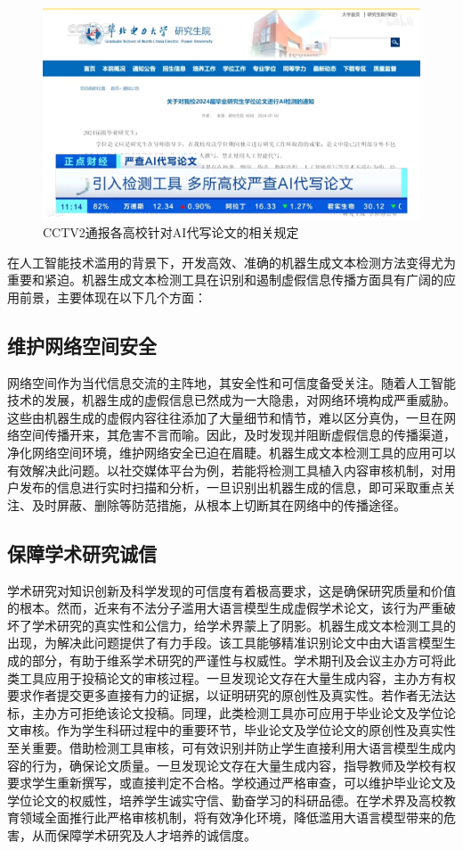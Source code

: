 \documentclass[a4paper]{report}
\begin{document}
\begin{figure}[H]
	\centering
	\includegraphics[width=1\textwidth]{高校针对AI代写论文的规定.png}
	\caption{CCTV2通报各高校针对AI代写论文的相关规定}
	\label{fig:高校针对AI代写论文的规定}
\end{figure}

在人工智能技术滥用的背景下，开发高效、准确的机器生成文本检测方法变得尤为重要和紧迫。机器生成文本检测工具在识别和遏制虚假信息传播方面具有广阔的应用前景，主要体现在以下几个方面：

\subsection{维护网络空间安全}
网络空间作为当代信息交流的主阵地，其安全性和可信度备受关注。随着人工智能技术的发展，机器生成的虚假信息已然成为一大隐患，对网络环境构成严重威胁。这些由机器生成的虚假内容往往添加了大量细节和情节，难以区分真伪，一旦在网络空间传播开来，其危害不言而喻。因此，及时发现并阻断虚假信息的传播渠道，净化网络空间环境，维护网络安全已迫在眉睫。机器生成文本检测工具的应用可以有效解决此问题。以社交媒体平台为例，若能将检测工具植入内容审核机制，对用户发布的信息进行实时扫描和分析，一旦识别出机器生成的信息，即可采取重点关注、及时屏蔽、删除等防范措施，从根本上切断其在网络中的传播途径。

\subsection{保障学术研究诚信}
学术研究对知识创新及科学发现的可信度有着极高要求，这是确保研究质量和价值的根本。然而，近来有不法分子滥用大语言模型生成虚假学术论文，该行为严重破坏了学术研究的真实性和公信力，给学术界蒙上了阴影。机器生成文本检测工具的出现，为解决此问题提供了有力手段。该工具能够精准识别论文中由大语言模型生成的部分，有助于维系学术研究的严谨性与权威性。学术期刊及会议主办方可将此类工具应用于投稿论文的审核过程。一旦发现论文存在大量生成内容，主办方有权要求作者提交更多直接有力的证据，以证明研究的原创性及真实性。若作者无法达标，主办方可拒绝该论文投稿。同理，此类检测工具亦可应用于毕业论文及学位论文审核。作为学生科研过程中的重要环节，毕业论文及学位论文的原创性及真实性至关重要。借助检测工具审核，可有效识别并防止学生直接利用大语言模型生成内容的行为，确保论文质量。一旦发现论文存在大量生成内容，指导教师及学校有权要求学生重新撰写，或直接判定不合格。学校通过严格审查，可以维护毕业论文及学位论文的权威性，培养学生诚实守信、勤奋学习的科研品德。在学术界及高校教育领域全面推行此严格审核机制，将有效净化环境，降低滥用大语言模型带来的危害，从而保障学术研究及人才培养的诚信度。
\end{document}
